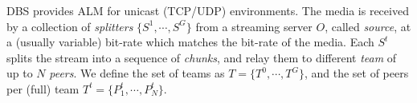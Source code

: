 DBS provides ALM for unicast (TCP/UDP) environments. The media is
received by a collection of
\emph{splitters} $\{S^1, \cdots, S^G\}$ from a streaming server $O$,
called \emph{source}, at a (usually variable) bit-rate which matches
the bit-rate of the media. Each $S^t$ splits the stream into a
sequence of \emph{chunks}, and relay them to different \emph{team} of
up to $N$ \emph{peers}. We define the set of teams as
$T=\{T^0, \cdots, T^G\}$, and the set of peers per (full) team
$T^t=\{P^t_1, \cdots, P^t_N\}$.


